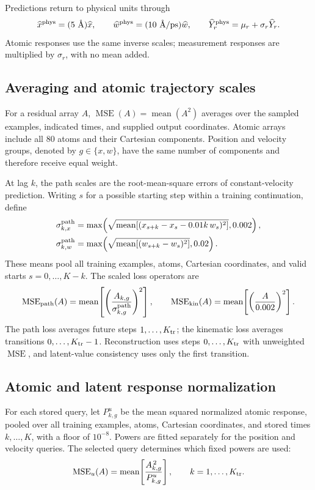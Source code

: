 \documentclass[11pt,a4paper]{article}
\numberwithin{equation}{section}
\newcommand{\MSE}{\operatorname{MSE}}
\newcommand{\mean}{\operatorname{mean}}
\begin{document}
Predictions return to physical units through
\begin{equation}
\widehat x^{\rm phys}=(5\ \text{\AA})\widehat x,\qquad
\widehat w^{\rm phys}=(10\ \text{\AA/ps})\widehat w,\qquad
\widehat Y_r^{\rm phys}=\mu_r+\sigma_r\widehat Y_r.
\end{equation}
Atomic responses use the same inverse scales; measurement responses are
multiplied by $\sigma_r$, with no mean added.

\subsection{Averaging and atomic trajectory scales}

For a residual array $A$, $\MSE(A)=\mean(A^2)$ averages over the sampled
examples, indicated times, and supplied output coordinates. Atomic arrays
include all 80 atoms and their Cartesian components. Position and velocity
groups, denoted by $g\in\{x,w\}$, have the same number of components and
therefore receive equal weight.

At lag $k$, the path scales are the root-mean-square errors of
constant-velocity prediction. Writing $s$ for a possible starting step
within a training continuation, define
\begin{align}
\sigma^{\rm path}_{k,x}
&=\max\!\left(\sqrt{\mean\!\left[
(x_{s+k}-x_s-0.01k\,w_s)^2\right]},0.002\right),\\
\sigma^{\rm path}_{k,w}
&=\max\!\left(\sqrt{\mean\!\left[
(w_{s+k}-w_s)^2\right]},0.02\right).
\end{align}
These means pool all training examples, atoms, Cartesian coordinates, and
valid starts $s=0,\ldots,K-k$. The scaled loss operators are
\begin{equation}
\MSE_{\rm path}(A)
=\mean\!\left[\left(\frac{A_{k,g}}{\sigma^{\rm path}_{k,g}}\right)^2\right],
\qquad
\MSE_{\rm kin}(A)=\mean\!\left[\left(\frac{A}{0.002}\right)^2\right].
\end{equation}
The path loss averages future steps $1,\ldots,K_{\rm tr}$; the kinematic
loss averages transitions $0,\ldots,K_{\rm tr}-1$. Reconstruction uses
steps $0,\ldots,K_{\rm tr}$ with unweighted $\MSE$, and latent-value
consistency uses only the first transition.

\subsection{Atomic and latent response normalization}

For each stored query, let $P^u_{k,g}$ be the mean squared normalized atomic
response, pooled over all training examples, atoms, Cartesian coordinates,
and stored times $k,\ldots,K$, with a floor of $10^{-8}$. Powers are fitted
separately for the position and velocity queries. The selected query determines
which fixed powers are used:
\begin{equation}
\MSE_u(A)=\mean\!\left[\frac{A_{k,g}^{\,2}}{P^u_{k,g}}\right],
\qquad k=1,\ldots,K_{\rm tr}.
\end{equation}
\end{document}
